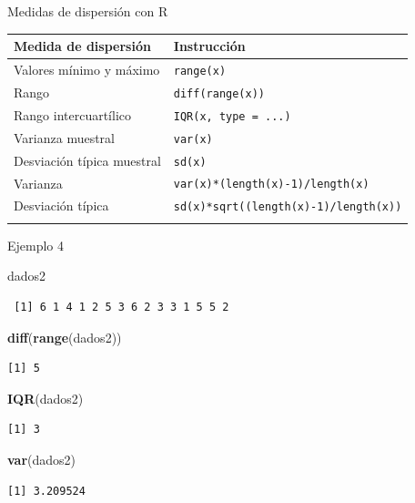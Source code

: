 \documentclass[
  ignorenonframetext,
]{beamer}
\newenvironment{Shaded}{\begin{snugshade}}{\end{snugshade}}
\newcommand{\FunctionTok}[1]{\textcolor[rgb]{0.13,0.29,0.53}{\textbf{#1}}}
\newcommand{\NormalTok}[1]{#1}
\begin{document}
\begin{frame}[fragile]{Medidas de dispersión con R}
\label{medidas-de-dispersiuxf3n-con-r}
\begin{longtable}[]{@{}ll@{}}
\toprule\noalign{}
Medida de dispersión & Instrucción \\
\midrule\noalign{}
\endhead
Valores mínimo y máximo & \texttt{range(x)} \\
Rango & \texttt{diff(range(x))} \\
Rango intercuartílico & \texttt{IQR(x,\ type\ =\ ...)} \\
Varianza muestral & \texttt{var(x)} \\
Desviación típica muestral & \texttt{sd(x)} \\
Varianza & \texttt{var(x)*(length(x)-1)/length(x)} \\
Desviación típica & \texttt{sd(x)*sqrt((length(x)-1)/length(x))} \\
\bottomrule\noalign{}
\end{longtable}
\end{frame}

\begin{frame}[fragile]{Ejemplo 4}
\label{ejemplo-4-15}
\begin{Shaded}
\begin{Highlighting}[]
\NormalTok{dados2}
\end{Highlighting}
\end{Shaded}

\begin{verbatim}
 [1] 6 1 4 1 2 5 3 6 2 3 3 1 5 5 2
\end{verbatim}

\begin{Shaded}
\begin{Highlighting}[]
\FunctionTok{diff}\NormalTok{(}\FunctionTok{range}\NormalTok{(dados2))}
\end{Highlighting}
\end{Shaded}

\begin{verbatim}
[1] 5
\end{verbatim}

\begin{Shaded}
\begin{Highlighting}[]
\FunctionTok{IQR}\NormalTok{(dados2)}
\end{Highlighting}
\end{Shaded}

\begin{verbatim}
[1] 3
\end{verbatim}

\begin{Shaded}
\begin{Highlighting}[]
\FunctionTok{var}\NormalTok{(dados2)}
\end{Highlighting}
\end{Shaded}

\begin{verbatim}
[1] 3.209524
\end{verbatim}
\end{frame}
\end{document}
